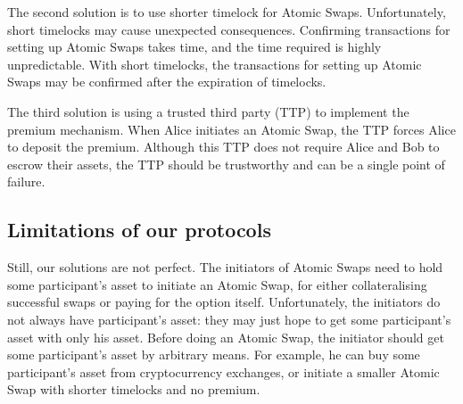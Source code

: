The second solution is to use shorter timelock for Atomic Swaps.
Unfortunately, short timelocks may cause unexpected consequences.
Confirming transactions for setting up Atomic Swaps takes time, and the time required is highly unpredictable.
With short timelocks, the transactions for setting up Atomic Swaps may be confirmed after the expiration of timelocks.

The third solution is using a trusted third party (TTP) to implement the premium mechanism.
When Alice initiates an Atomic Swap, the TTP forces Alice to deposit the premium.
Although this TTP does not require Alice and Bob to escrow their assets, the TTP should be trustworthy and can be a single point of failure.

\subsection{Limitations of our protocols}

Still, our solutions are not perfect.
The initiators of Atomic Swaps need to hold some participant's asset to initiate an Atomic Swap,
for either collateralising successful swaps or paying for the option itself.
Unfortunately, the initiators do not always have participant's asset: they may just hope to get some participant's asset with only his asset.
Before doing an Atomic Swap, the initiator should get some participant's asset by arbitrary means.
For example, he can buy some participant's asset from cryptocurrency exchanges, or initiate a smaller Atomic Swap with shorter timelocks and no premium.
